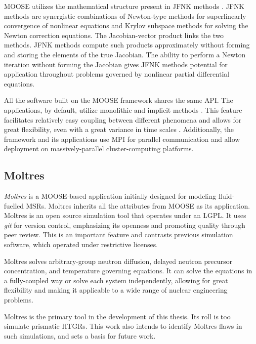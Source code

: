 \gls{MOOSE} utilizes the mathematical structure present in \gls{JFNK} methods \cite{knoll_jacobian-free_2004}\cite{gaston_moose_2009}.
\gls{JFNK} methods are synergistic combinations of Newton-type methods for superlinearly convergence of nonlinear equations and Krylov subspace methods for solving the Newton correction equations.
The Jacobian-vector product links the two methods.
JFNK methods compute such products approximately without forming and storing the elements of the true Jacobian.
The ability to perform a Newton iteration without forming the Jacobian gives JFNK methods potential for application throughout problems governed by nonlinear partial differential equations.

All the software built on the MOOSE framework shares the same \gls{API}.
The applications, by default, utilize monolithic and implicit methods \cite{lindsay_introduction_2018}.
This feature facilitates relatively easy coupling between different phenomena and allows for great flexibility, even with a great variance in time scales \cite{novak_pronghorn_2018}.
Additionally, the framework and its applications use \gls{MPI} for parallel communication and allow deployment on massively-parallel cluster-computing platforms.

\subsection{Moltres}
\label{sec:ch3-moltres}

\textit{Moltres} is a MOOSE-based application initially designed for modeling fluid-fuelled \glspl{MSR}.
Moltres inherits all the attributes from MOOSE as its application.
Moltres is an open source simulation tool that operates under an LGPL.
It uses \textit{git} for version control, emphasizing its openness and promoting quality through peer review.
This is an important feature and contrasts previous simulation software, which operated under restrictive licenses.

Moltres solves arbitrary-group neutron diffusion, delayed neutron precursor concentration, and temperature governing equations.
It can solve the equations in a fully-coupled way or solve each system independently, allowing for great flexibility and making it applicable to a wide range of nuclear engineering problems.

Moltres is the primary tool in the development of this thesis.
Its roll is too simulate prismatic HTGRs.
This work also intends to identify Moltres flaws in such simulations, and sets a basis for future work.

